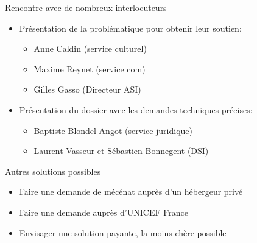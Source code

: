 \begin{frame}
	\begin{block}{Rencontre avec de nombreux interlocuteurs}
	\begin{itemize}
    	\item Présentation de la problématique pour obtenir leur soutien:
		\begin{itemize}
			\item Anne Caldin (service culturel)
			\item Maxime Reynet (service com)
			\item Gilles Gasso (Directeur ASI)
		\end{itemize}
		\item Présentation du dossier avec les demandes techniques précises:
		\begin{itemize}
			\item Baptiste Blondel-Angot (service juridique)
			\item Laurent Vasseur et Sébastien Bonnegent (DSI)
		\end{itemize}    
	\end{itemize}
	\end{block}
\end{frame}

\begin{frame}
	\begin{block}{Autres solutions possibles}
      \begin{itemize}
        \item Faire une demande de mécénat auprès d'un hébergeur privé
        \item Faire une demande auprès d'UNICEF France
        \item Envisager une solution payante, la moins chère possible
      \end{itemize}
    \end{block}
\end{frame}

